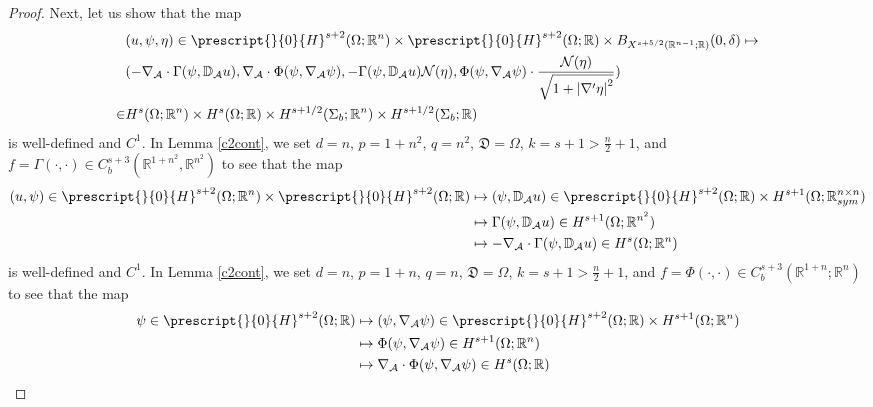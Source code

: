 \documentclass[11pt,letterpaper,reqno]{amsart}
\numberwithin{equation}{section}
\newcommand{\abs}[1]{\left\lvert#1\right\rvert}
\begin{document}
\begin{proof}
    Next, let us show that the map
    \begin{align}
        &(u,\psi,\eta) \in \prescript{}{0}{H}^{s+2}(\Omega;\mathbb{R}^{n}) \times \prescript{}{0}{H}^{s+2}(\Omega;\mathbb{R}) \times B_{X^{s+5/2}(\mathbb{R}^{n-1};\mathbb{R})}(0,\delta) \mapsto \nonumber \\
        &(-\nabla_{\mathcal{A}}\cdot \Gamma(\psi,\mathbb{D}_{\mathcal{A}}u), \nabla_{\mathcal{A}} \cdot \Phi(\psi,\nabla_{\mathcal{A}}\psi),-\Gamma(\psi,\mathbb{D}_{\mathcal{A}}u)\mathcal{N}(\eta),\Phi(\psi,\nabla_{\mathcal{A}}\psi)\cdot \frac{\mathcal{N}(\eta)}{\sqrt{1+\abs{\nabla'\eta}^{2}}}) \nonumber\\
        \in&H^{s}(\Omega;\mathbb{R}^{n}) \times H^{s}(\Omega;\mathbb{R}) \times H^{s+1/2}(\Sigma_{b};\mathbb{R}^{n}) \times H^{s+1/2}(\Sigma_{b};\mathbb{R})
    \end{align}
    is well-defined and \(C^{1}\). In Lemma \ref{c2cont}, we set \(d=n\), \(p=1+n^{2}\), \(q=n^{2}\), \(\mathfrak{D}=\Omega\), \(k=s+1> \frac{n}{2}+1\), and \(f=\Gamma(\cdot,\cdot) \in C_{b}^{s+3}(\mathbb{R}^{1+n^{2}},\mathbb{R}^{n^{2}})\) to see that the map
    \begin{align}
        (u,\psi) \in \prescript{}{0}{H}^{s+2}(\Omega;\mathbb{R}^{n}) \times \prescript{}{0}{H}^{s+2}(\Omega;\mathbb{R}) &\mapsto (\psi,\mathbb{D}_{\mathcal{A}}u) \in \prescript{}{0}{H}^{s+2}(\Omega;\mathbb{R}) \times H^{s+1}(\Omega;\mathbb{R}_{sym}^{n \times n}) \nonumber\\
        &\mapsto \Gamma(\psi,\mathbb{D}_{\mathcal{A}}u) \in H^{s+1}(\Omega;\mathbb{R}^{n^{2}}) \nonumber\\
        &\mapsto -\nabla_{\mathcal{A}} \cdot \Gamma(\psi,\mathbb{D}_{\mathcal{A}}u) \in H^{s}(\Omega;\mathbb{R}^{n})
    \end{align}
    is well-defined and \(C^{1}\). In Lemma \ref{c2cont}, we set \(d=n\), \(p=1+n\), \(q=n\), \(\mathfrak{D}=\Omega\), \(k=s+1>\frac{n}{2}+1\), and \(f=\Phi(\cdot,\cdot) \in C_{b}^{s+3}(\mathbb{R}^{1+n};\mathbb{R}^{n})\) to see that the map
    \begin{align}
        \psi \in \prescript{}{0}{H}^{s+2}(\Omega;\mathbb{R}) &\mapsto (\psi,\nabla_{\mathcal{A}}\psi) \in \prescript{}{0}{H}^{s+2}(\Omega;\mathbb{R}) \times H^{s+1}(\Omega;\mathbb{R}^{n}) \nonumber\\
        &\mapsto \Phi(\psi,\nabla_{\mathcal{A}}\psi) \in H^{s+1}(\Omega;\mathbb{R}^{n}) \nonumber\\
        &\mapsto \nabla_{\mathcal{A}} \cdot \Phi(\psi,\nabla_{\mathcal{A}}\psi) \in H^{s}(\Omega;\mathbb{R})

\end{align}
\end{proof}
\end{document}
